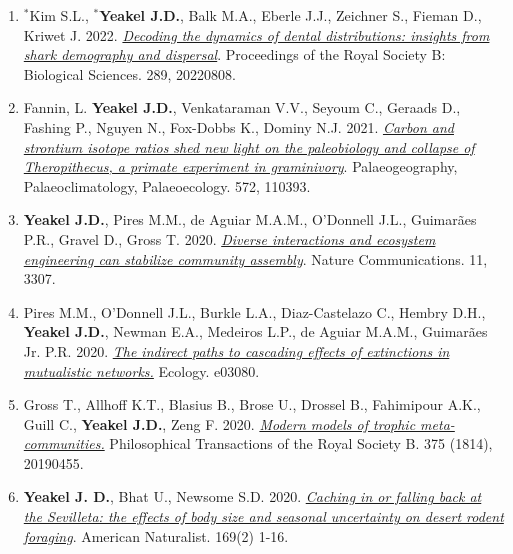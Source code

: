 \documentclass[margin,line,12pt]{res}
\begin{document}
\begin{resume}
\begin{enumerate}
\item ${}^\ast$Kim S.L., \textbf{${}^\ast$Yeakel J.D.}, Balk M.A., Eberle J.J., Zeichner S., Fieman D., Kriwet J. 2022. \href{https://doi.org/10.1098/rspb.2022.0808}{\emph{Decoding the dynamics of dental distributions: insights from shark demography and dispersal}}. Proceedings of the Royal Society B: Biological Sciences. 289, 20220808.

\item Fannin, L. \textbf{Yeakel J.D.}, Venkataraman V.V., Seyoum C., Geraads D., Fashing P., Nguyen N., Fox-Dobbs K., Dominy N.J.  2021. \href{https://doi.org/10.1016/j.palaeo.2021.110393}{\emph{ Carbon and strontium isotope ratios shed new light on the paleobiology and collapse of Theropithecus, a primate experiment in graminivory}}. Palaeogeography, Palaeoclimatology, Palaeoecology. 572, 110393.

\item \textbf{Yeakel J.D.}, Pires M.M., de Aguiar M.A.M., O'Donnell J.L., Guimar\~aes P.R., Gravel D., Gross T. 2020. \href{https://www.nature.com/articles/s41467-020-17164-x}{\emph{Diverse interactions and ecosystem engineering can stabilize community assembly}}. Nature Communications. 11, 3307.

\item Pires M.M., O'Donnell J.L., Burkle L.A., Diaz-Castelazo C., Hembry D.H., \textbf{Yeakel J.D.}, Newman E.A., Medeiros L.P., de Aguiar M.A.M., Guimar\~aes Jr. P.R. 2020. \href{https://esajournals.onlinelibrary.wiley.com/doi/pdf/10.1002/ecy.3080}{\emph{The indirect paths to cascading effects of extinctions in mutualistic networks.}} Ecology. e03080.

\item Gross T., Allhoff K.T., Blasius B., Brose U., Drossel B., Fahimipour A.K., Guill C., \textbf{Yeakel J.D.}, Zeng F. 2020. \href{https://royalsocietypublishing.org/doi/pdf/10.1098/rstb.2019.0455}{\emph{Modern models of trophic meta-communities.}} Philosophical Transactions of the Royal Society B. 375 (1814), 20190455.

\item \textbf{Yeakel J. D.}, Bhat U., Newsome S.D. 2020. \href{https://www.journals.uchicago.edu/doi/10.1086/709019}{\emph{Caching in or falling back at the Sevilleta: the effects of body size and seasonal uncertainty on desert rodent foraging}}. American Naturalist. 169(2) 1-16.


\end{enumerate}
\end{resume}
\end{document}
